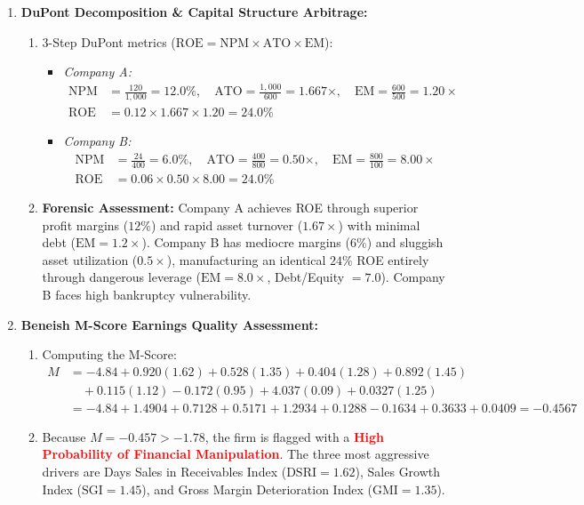 \begin{enumerate}[label=\textbf{P5.\arabic*}]
    \item \textbf{DuPont Decomposition \& Capital Structure Arbitrage:}
    \begin{enumerate}[label=(\alph*)]
        \item 3-Step DuPont metrics ($\text{ROE} = \text{NPM} \times \text{ATO} \times \text{EM}$):
        \begin{itemize}
            \item \textit{Company A:}
            \begin{align*}
            \text{NPM} &= \frac{120}{1{,}000} = 12.0\%, \quad \text{ATO} = \frac{1{,}000}{600} = 1.667\times, \quad \text{EM} = \frac{600}{500} = 1.20\times \\
            \text{ROE} &= 0.12 \times 1.667 \times 1.20 = \mathbf{24.0\%}
            \end{align*}
            \item \textit{Company B:}
            \begin{align*}
            \text{NPM} &= \frac{24}{400} = 6.0\%, \quad \text{ATO} = \frac{400}{800} = 0.50\times, \quad \text{EM} = \frac{800}{100} = 8.00\times \\
            \text{ROE} &= 0.06 \times 0.50 \times 8.00 = \mathbf{24.0\%}
            \end{align*}
        \end{itemize}
        \item \textbf{Forensic Assessment:} Company A achieves ROE through superior profit margins ($12\%$) and rapid asset turnover ($1.67\times$) with minimal debt ($\text{EM} = 1.2\times$). Company B has mediocre margins ($6\%$) and sluggish asset utilization ($0.5\times$), manufacturing an identical $24\%$ ROE entirely through dangerous leverage ($\text{EM} = 8.0\times$, Debt/Equity $= 7.0$). Company B faces high bankruptcy vulnerability.
    \end{enumerate}

    \item \textbf{Beneish M-Score Earnings Quality Assessment:}
    \begin{enumerate}[label=(\alph*)]
        \item Computing the M-Score:
        \begin{align*}
        M &= -4.84 + 0.920(1.62) + 0.528(1.35) + 0.404(1.28) + 0.892(1.45) \\
        &\quad + 0.115(1.12) - 0.172(0.95) + 4.037(0.09) + 0.0327(1.25) \\
        &= -4.84 + 1.4904 + 0.7128 + 0.5171 + 1.2934 + 0.1288 - 0.1634 + 0.3633 + 0.0409 = \mathbf{-0.4567}
        \end{align*}
        \item Because $M = -0.457 > -1.78$, the firm is flagged with a \textcolor{red}{\textbf{High Probability of Financial Manipulation}}. The three most aggressive drivers are Days Sales in Receivables Index ($\text{DSRI} = 1.62$), Sales Growth Index ($\text{SGI} = 1.45$), and Gross Margin Deterioration Index ($\text{GMI} = 1.35$).
    \end{enumerate}


\end{enumerate}
